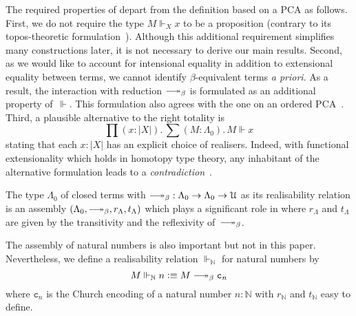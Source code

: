 \documentclass[a4paper,UKenglish,numberwithinsect,cleveref,thm-restate]{lipics-v2021}
\newcommand{\Nat}{\mathbb{N}}
\newcommand{\defeq}{\vcentcolon\equiv}
\newcommand{\Univ}{\mathcal{U}}
\DeclareRobustCommand\longtwoheadrightarrow{\relbar\joinrel\twoheadrightarrow}
\newcommand{\reduce}{\longtwoheadrightarrow_{\beta}}
\theoremstyle{plain}
\begin{document}
The required properties of  depart from the definition based on a PCA as follows. 
First, we do not require the type $M \Vdash_X x$ to be a proposition (contrary to its topos-theoretic formulation~\cite{Birkedal2002a}).
Although this additional requirement simplifies many constructions later, it is not necessary to derive our main results.
Second, as we would like to account for intensional equality in addition to extensional equality between terms,
we cannot identify $\beta$-equivalent terms \emph{a priori}.
As a result, the interaction with reduction $\reduce$ is formulated as an additional property of~$\Vdash$. 
This formulation also agrees with the one on an ordered PCA~\cite[Section~2.3]{Hofstra2003}.
Third, a plausible alternative to the right totality is
\[
  \prod (x : |X|).\, \sum (M : \Lambda_0).\, M \Vdash x
\]
stating that each $x : |X|$ has an explicit choice of realisers.
Indeed, with functional extensionality which holds in homotopy type theory, any inhabitant of the alternative formulation leads to a \emph{contradiction}~\cite{Troelstra1977}. 

\begin{example}\label{ex:assembly-lambda}
  The type $\Lambda_0$ of closed terms with ${\reduce} : \Lambda_0 \to \Lambda_0 \to \Univ$ as its realisability relation is an assembly $(\Lambda_0, \reduce, r_\Lambda, t_\Lambda)$ which plays a significant role in  where $r_\Lambda$ and $t_\Lambda$ are given by the transitivity and the reflexivity of~$\reduce$.
\end{example}

\begin{example}
  The assembly of natural numbers is also important but not in this paper.
  Nevertheless, we define a realisability relation $\Vdash_{\Nat}$ for natural numbers by
  \[
    M \Vdash_\Nat n \defeq M \reduce \mathtt{c}_n
  \]
  where $\mathtt{c}_n$ is the Church encoding of a natural number $n : \Nat$ with $r_\Nat$ and $t_\Nat$ easy to define. 
\end{example}
\end{document}
